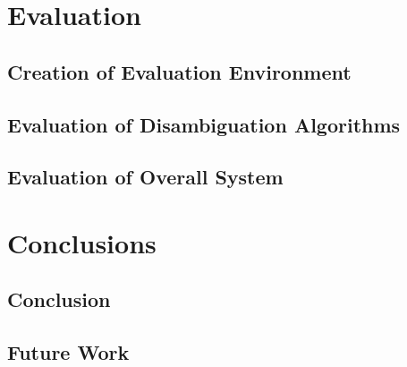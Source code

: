 \documentclass[12pt, a4paper]{report}
\begin{document}


\chapter{Evaluation}

\section{Creation of Evaluation Environment}

\section{Evaluation of Disambiguation Algorithms}


\section{Evaluation of Overall System}


\chapter{Conclusions}

\section{Conclusion}

\section{Future Work}









\end{document}
